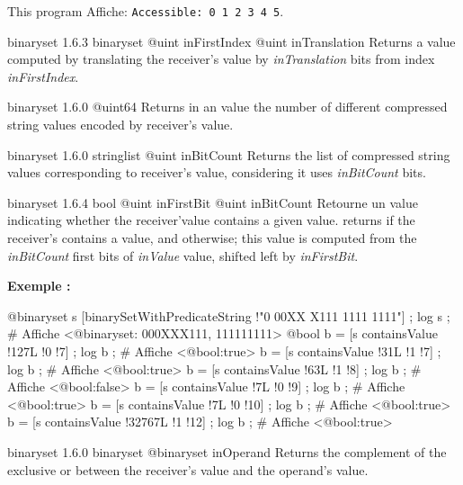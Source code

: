 This program Affiche: \texttt{Accessible: 0 1 2 3 4 5}.




{binaryset}
{1.6.3}
{binaryset}
{@uint inFirstIndex}
{@uint inTranslation}
{Returns a  value computed by translating the receiver's value by \emph{inTranslation} bits from index \emph{inFirstIndex}.}
{}



{binaryset}
{1.6.0}
{@uint64}
{Returns in an  value the number of different compressed string values encoded by receiver's value.}
{}




{binaryset}
{1.6.0}
{stringlist}
{@uint inBitCount}
{Returns the list of compressed string values corresponding to receiver's value, considering it uses \emph{inBitCount} bits.}
{}










{binaryset}
{1.6.4}
{bool}
{@uint inFirstBit}
{@uint inBitCount}
{Retourne un  value indicating whether the receiver'value contains a given value.}
{returns  if the receiver's contains a value, and  otherwise; this value is computed from the \emph{inBitCount} first bits of \emph{inValue} value, shifted left by \emph{inFirstBit}.}


\textbf{Exemple :}
\begin{galgascode}
@binaryset s [binarySetWithPredicateString !"0 00XX X111 1111 1111"] ;
log s ; \# Affiche <@binaryset: 000XXX111, 111111111>
@bool b = [s containsValue !127L !0 !7] ;
log b ; \# Affiche <@bool:true>
b = [s containsValue !31L !1 !7] ;
log b ; \# Affiche <@bool:true>
b = [s containsValue !63L !1 !8] ;
log b ; \# Affiche <@bool:false>
b = [s containsValue !7L !0 !9] ;
log b ; \# Affiche <@bool:true>
b = [s containsValue !7L !0 !10] ;
log b ; \# Affiche <@bool:true>
b = [s containsValue !32767L !1 !12] ;
log b ; \# Affiche <@bool:true>
\end{galgascode}








{binaryset}
{1.6.0}
{binaryset}
{@binaryset inOperand}
{Returns the complement of the exclusive or between the receiver's value and the operand's value.}
{}

